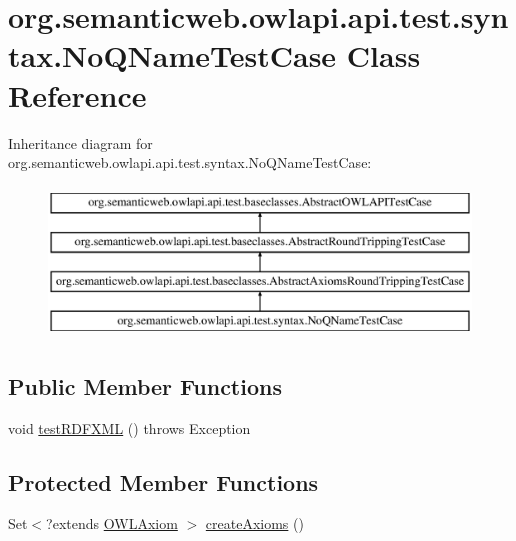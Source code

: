 \hypertarget{classorg_1_1semanticweb_1_1owlapi_1_1api_1_1test_1_1syntax_1_1_no_q_name_test_case}{\section{org.\-semanticweb.\-owlapi.\-api.\-test.\-syntax.\-No\-Q\-Name\-Test\-Case Class Reference}
\label{classorg_1_1semanticweb_1_1owlapi_1_1api_1_1test_1_1syntax_1_1_no_q_name_test_case}
}
Inheritance diagram for org.\-semanticweb.\-owlapi.\-api.\-test.\-syntax.\-No\-Q\-Name\-Test\-Case\-:\begin{figure}[H]
\begin{center}
\leavevmode
\includegraphics[height=4.000000cm]{classorg_1_1semanticweb_1_1owlapi_1_1api_1_1test_1_1syntax_1_1_no_q_name_test_case}
\end{center}
\end{figure}
\subsection*{Public Member Functions}
\begin{DoxyCompactItemize}
\item 
void \hyperlink{classorg_1_1semanticweb_1_1owlapi_1_1api_1_1test_1_1syntax_1_1_no_q_name_test_case_a7cf3f71c5dfba8c66b1ab8530efebd8a}{test\-R\-D\-F\-X\-M\-L} ()  throws Exception 
\end{DoxyCompactItemize}
\subsection*{Protected Member Functions}
\begin{DoxyCompactItemize}
\item 
Set$<$?extends \hyperlink{interfaceorg_1_1semanticweb_1_1owlapi_1_1model_1_1_o_w_l_axiom}{O\-W\-L\-Axiom} $>$ \hyperlink{classorg_1_1semanticweb_1_1owlapi_1_1api_1_1test_1_1syntax_1_1_no_q_name_test_case_a286a749e51545914fa9b77b0b0096def}{create\-Axioms} ()
\end{DoxyCompactItemize}



